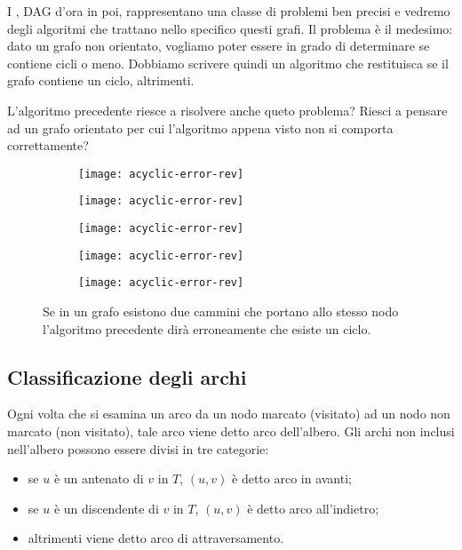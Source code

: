 I , DAG d'ora in poi, rappresentano una classe di problemi ben precisi e vedremo degli algoritmi che trattano nello specifico questi grafi.
Il problema è il medesimo: dato un grafo non orientato, vogliamo poter essere in grado di determinare se contiene cicli o meno.
Dobbiamo scrivere quindi un algoritmo che restituisca \True se il grafo contiene un ciclo, \False altrimenti.

L'algoritmo precedente riesce a risolvere anche queto problema?
Riesci a pensare ad un grafo orientato per cui l'algoritmo appena visto non si comporta correttamente?

\begin{figure}[H]
	\centering
	\begin{subfigure}{.18\textwidth}
		\texttt{[image: acyclic-error-rev]}
	\end{subfigure}\hfill
	\begin{subfigure}{.18\textwidth}
		\texttt{[image: acyclic-error-rev]}
	\end{subfigure}\hfill
	\begin{subfigure}{.18\textwidth}
		\texttt{[image: acyclic-error-rev]}
	\end{subfigure}\hfill
	\begin{subfigure}{.18\textwidth}
		\texttt{[image: acyclic-error-rev]}
	\end{subfigure}\hfill
	\begin{subfigure}{.18\textwidth}
		\texttt{[image: acyclic-error-rev]}
	\end{subfigure}
	\caption[]{Se in un grafo esistono due cammini che portano allo stesso nodo l'algoritmo precedente dirà erroneamente che esiste un ciclo.}
\end{figure}

\clearpage
\subsection*{Classificazione degli archi}

Ogni volta che si esamina un arco da un nodo marcato (visitato) ad un nodo non marcato (non visitato), tale arco viene detto arco dell'albero.
Gli archi non inclusi nell'albero possono essere divisi in tre categorie:
\begin{itemize}
	\item se \(u\) è un antenato di \(v\) in \(T\), \((u,v)\) è detto arco in avanti;
	\item se \(u\) è un discendente di \(v\) in \(T\), \((u,v)\) è detto arco all'indietro;
	\item altrimenti viene detto arco di attraversamento.
\end{itemize}


